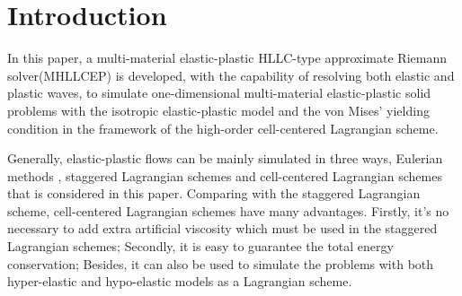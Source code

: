 \documentclass[review]{elsarticle}
\begin{document}
\section{Introduction}

In this paper, a multi-material elastic-plastic HLLC-type approximate Riemann solver(MHLLCEP) is developed, with the capability of resolving both elastic and plastic waves, to simulate one-dimensional  multi-material elastic-plastic solid problems with the isotropic elastic-plastic model \cite{wilkins1963calculation} and  the von Mises' yielding condition in the framework of the  high-order cell-centered Lagrangian scheme.

Generally, elastic-plastic flows can be mainly simulated in three ways, Eulerian methods \cite{trangenstein1991higher,miller2001high,barton2009exact}, staggered Lagrangian schemes \cite{wilkins1963calculation} and cell-centered Lagrangian schemes \cite{burton2013cell,kluth2010discretization,maire2013nominally,cheng2017third} that  is considered in this paper. Comparing with the staggered Lagrangian scheme, cell-centered Lagrangian  schemes  have many advantages. Firstly, it's no necessary to add  extra artificial viscosity  which  must be used in the staggered Lagrangian schemes; Secondly, it is easy to guarantee the total energy conservation; Besides, it can also be used to simulate the problems with both  hyper-elastic and hypo-elastic models  \cite{burton2013cell,kluth2010discretization,maire2013nominally,cheng2017third}  as a Lagrangian scheme.
\end{document}
